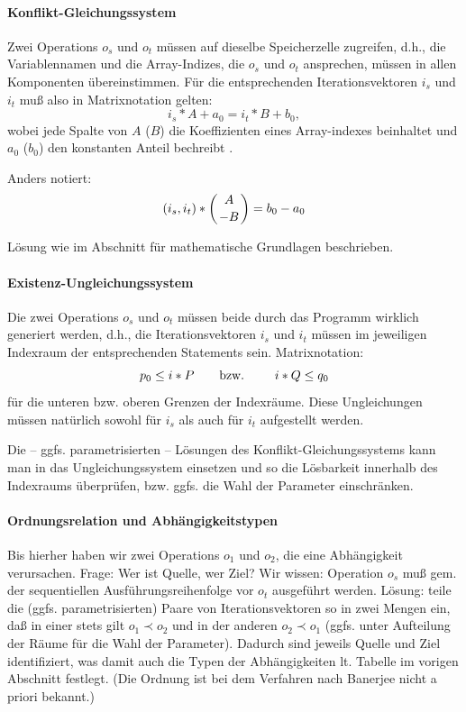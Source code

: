 \paragraph{Konflikt-Gleichungssystem}

Zwei Operations $o_s$ und $o_t$ müssen auf dieselbe Speicherzelle
zugreifen, d.h., die Variablennamen und die Array-Indizes, die $o_s$ und
$o_t$ ansprechen, müssen in allen Komponenten übereinstimmen. Für die
entsprechenden Iterationsvektoren $i_s$ und $i_t$ muß also in
Matrixnotation gelten: 
$$i_s * A + a_0 = i_t * B + b_0,$$ wobei jede Spalte von $A$ ($B$) die
Koeffizienten eines Array-indexes beinhaltet und $a_0$ ($b_0$) den
konstanten Anteil bechreibt \cite{Ban93}.

Anders notiert: $$(i_s, i_t) * \left( {A \atop -B} \right) = b_0-a_0$$

Lösung wie im Abschnitt für mathematische Grundlagen
beschrieben. 

\paragraph{Existenz-Ungleichungssystem}

Die zwei Operations $o_s$ und $o_t$ müssen beide durch das Programm
wirklich generiert werden, d.h., die Iterationsvektoren $i_s$ und $i_t$
müssen im jeweiligen Indexraum der entsprechenden Statements
sein. Matrixnotation: $$p_0 \leq i * P \hbox{\qquad bzw. \qquad} i*Q \leq
q_0$$ für die unteren bzw. oberen Grenzen der Indexräume. Diese
Ungleichungen müssen natürlich sowohl für $i_s$ als auch für $i_t$
aufgestellt werden.

Die -- ggfs. parametrisierten -- Lösungen des Konflikt-Gleichungssystems
kann man in das Ungleichungssystem einsetzen und so die Lösbarkeit
innerhalb des Indexraums überprüfen, bzw. ggfs. die Wahl der Parameter
einschränken.

\paragraph{Ordnungsrelation und Abhängigkeitstypen}

Bis hierher haben wir zwei Operations $o_1$ und $o_2$, die eine
Abhängigkeit verursachen. Frage: Wer ist Quelle, wer Ziel?  Wir wissen:
Operation $o_s$ muß gem.  der sequentiellen Ausführungsreihenfolge vor
$o_t$ ausgeführt werden. Lösung: teile die (ggfs. parametrisierten)
Paare von Iterationsvektoren so in zwei Mengen ein, daß in einer stets
gilt $o_1 \prec o_2$ und in der anderen $o_2 \prec o_1$ (ggfs. unter
Aufteilung der Räume für die Wahl der Parameter). Dadurch sind jeweils
Quelle und Ziel identifiziert, was damit auch die Typen der
Abhängigkeiten lt. Tabelle im vorigen Abschnitt festlegt. (Die Ordnung ist bei dem Verfahren nach Banerjee nicht a priori bekannt.)


